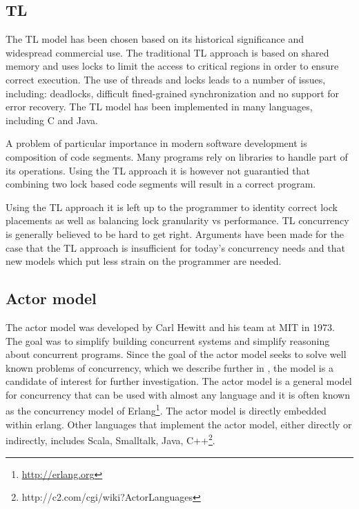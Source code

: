 \subsection{\acl{TL}}
\label{subsec:tl}
The \ac{TL} model has been chosen based on its historical significance and widespread commercial use\cite[p. 58]{sutter2005software}. The traditional \ac{TL} approach is based on shared memory and uses locks to limit the access to critical regions in order to ensure correct execution\cite[p. 1]{saha2006mcrt}. The use of threads and locks leads to a number of issues, including: deadlocks, difficult fined-grained synchronization and no support for error recovery\cite[p. 187]{saha2006mcrt}. The \ac{TL} model has been implemented in many languages, including C and Java. 

A problem of particular importance in modern software development is composition of code segments. Many programs rely on libraries to handle part of its operations. Using the \ac{TL} approach it is however not guarantied that combining two lock based code segments will result in a correct program\cite[p. 56]{sutter2005software}.

Using the \ac{TL} approach it is left up to the programmer to identity correct lock placements as well as balancing lock granularity vs performance\cite[p. 49]{harris2005composable}. \ac{TL} concurrency is generally believed to be hard to get right\cite[p. 92]{herlihy2003software}. Arguments have been made for the case that the \ac{TL} approach is insufficient for today's concurrency needs and that new models which put less strain on the programmer are needed\cite[p. 3]{jones2007beautiful}\cite[p. 48]{harris2005composable}.


\subsection{Actor model}
The actor model was developed by Carl Hewitt and his team at MIT in 1973\cite{hewitt1973universal}. The goal was to simplify building concurrent systems and simplify reasoning about concurrent programs\cite[p. 14]{haller2012actors}. Since the goal of the actor model seeks to solve well known problems of concurrency, which we describe further in , the model is a candidate of interest for further investigation. The actor model is a general model for concurrency that can be used with almost any language and it is often known as the concurrency model of Erlang\footnote{\url{http://erlang.org}}. The actor model is directly embedded within erlang\cite[p. 115]{sevenModels}. Other languages that implement the actor model, either directly or indirectly, includes Scala, Smalltalk, Java, C++\footnote{http://c2.com/cgi/wiki?ActorLanguages}. %

